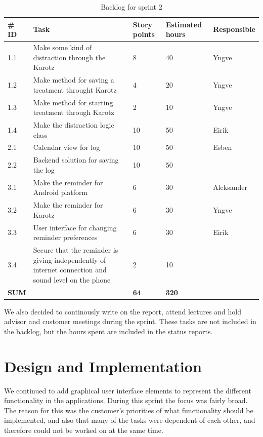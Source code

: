 \begin{table}[t]
	\begin{center}
		\begin{tabular}{|p{2.0cm}| p{8.0cm}| p{2.0cm}|p{2.0cm}|p{2.0cm}|}
			\hline
			\#  ID 	& Task 	& Story points 	& Estimated hours & Responsible \\
			\hline
			1.1 & Make some kind of distraction through the Karotz		&  8  & 40  & Yngve \\
			\hline
			1.2 & Make method for saving a treatment throught Karotz  	&  4  & 20	& Yngve\\
			\hline
			1.3 & Make method for starting treatment through Karotz  	&  2  & 10	& Yngve\\
			\hline
			1.4 & Make the distraction logic class 						& 10  & 50  & Eirik \\
			\hline
			2.1 & Calendar view for log 								& 10  & 50  & Esben\\
			\hline
			2.2 & Backend solution for saving the log 					& 10  & 50  & \\
			\hline
			3.1 & Make the reminder for Android platform 				&  6  & 30  & Aleksander \\
			\hline
			3.2 & Make the reminder for Karotz 							&  6  & 30  & Yngve \\
			\hline
			3.3 & User interface for changing reminder preferences 		&  6  & 30  & Eirik \\
			\hline
			3.4 & Secure that the reminder is giving independently of 
				  internet connection and sound level on the phone 		&  2  & 10  &  \\
			\hline
			\bfseries{SUM} &											& \bfseries{64} & \bfseries{320} & \\
			\hline
			\hline
		\end{tabular}
	\end{center}
	\caption{Backlog for sprint 2}
\end{table}

We also decided to continously write on the report, attend lectures and hold advisor and 
customer meetings during the sprint. These tasks are not included in the backlog, but the hours 
spent are included in the status reports.

\section{Design and Implementation}
\label{sec:sprint2designAndImplementation}
We continued to add graphical user interface elements to represent the different functionality
in the applications. During this sprint the focus was fairly broad.
The reason for this was the customer's priorities of what functionality should
be implemented, and also that many of the tasks were dependent of each other, and therefore could not be worked on at the same time.

